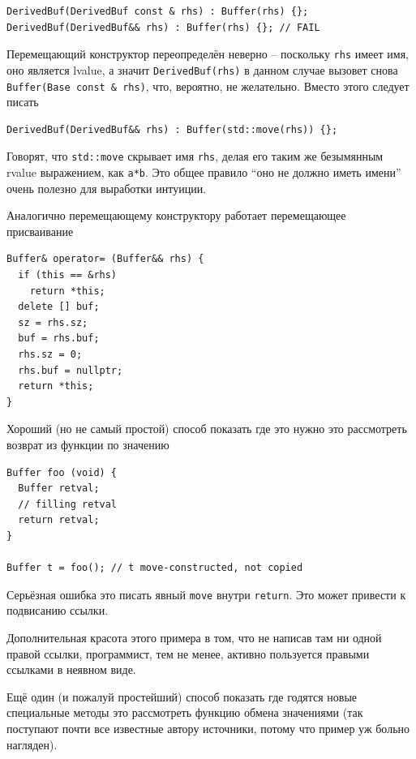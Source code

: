 \documentclass[a4paper,12pt,oneside]{article}
\begin{document}
\begin{lstlisting}
DerivedBuf(DerivedBuf const & rhs) : Buffer(rhs) {};
DerivedBuf(DerivedBuf&& rhs) : Buffer(rhs) {}; // FAIL
\end{lstlisting}

Перемещающий конструктор переопределён неверно -- поскольку \lstinline!rhs! имеет имя, оно является lvalue, а значит \lstinline!DerivedBuf(rhs)! в данном случае вызовет снова \lstinline!Buffer(Base const & rhs)!, что, вероятно, не желательно. Вместо этого следует писать

\begin{lstlisting}
DerivedBuf(DerivedBuf&& rhs) : Buffer(std::move(rhs)) {};
\end{lstlisting}

Говорят, что \lstinline!std::move! скрывает имя \lstinline!rhs!, делая его таким же безымянным rvalue выражением, как \lstinline!a*b!. Это общее правило ``оно не должно иметь имени'' очень полезно для выработки интуиции.

Аналогично перемещающему конструктору работает перемещающее присваивание

\begin{lstlisting}
Buffer& operator= (Buffer&& rhs) {
  if (this == &rhs) 
    return *this;
  delete [] buf;
  sz = rhs.sz;
  buf = rhs.buf;
  rhs.sz = 0;
  rhs.buf = nullptr;
  return *this;
} 
\end{lstlisting}

Хороший (но не самый простой) способ показать где это нужно это рассмотреть возврат из функции по значению

\begin{lstlisting}
Buffer foo (void) {
  Buffer retval;
  // filling retval
  return retval;
}

Buffer t = foo(); // t move-constructed, not copied
\end{lstlisting}

Серьёзная ошибка это писать явный \lstinline!move! внутри \lstinline!return!. Это может привести к подвисанию ссылки. 

Дополнительная красота этого примера в том, что не написав там ни одной правой ссылки, программист, тем не менее, активно пользуется правыми ссылками в неявном виде.

Ещё один (и пожалуй простейший) способ показать где годятся новые специальные методы это рассмотреть функцию обмена значениями (так поступают почти все известные автору источники, потому что пример уж больно нагляден).
\end{document}
